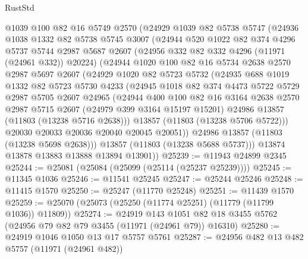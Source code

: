 \begin{lexlean}{RustStd}
\begin{coremodule}
    @1039
    @100
    @82
    @16
    @5749
    @2570
    (@24929
      @1039
      @82
      @5738
      @5747
      (@24936
        @1038
        @1332
        @82
        @5738
        @5745
        @3007
        (@24944
          @520
          @1022
          @82
          @374
          @4296
          @5737
          @5744
          @2987
          @5687
          @2607
          (@24956 @332 @82 @332 @4296 (@11971 (@24961 @332)) @20224)
          (@24944
            @1020
            @100
            @82
            @16
            @5734
            @2638
            @2570
            @2987
            @5697
            @2607
            (@24929
              @1020
              @82
              @5723
              @5732
              (@24935
                @688
                @1019
                @1332
                @82
                @5723
                @5730
                @4233
                (@24945
                  @1018
                  @82
                  @374
                  @4473
                  @5722
                  @5729
                  @2987
                  @5705
                  @2607
                  @24965
                  (@24944
                    @400
                    @100
                    @82
                    @16
                    @3164
                    @2638
                    @2570
                    @2987
                    @5715
                    @2607
                    (@24979 @399 @3164 @15197 @15201)
                    @24986
                    @13857
                    (@11803 (@13238 @5716 @2638)))
                  @13857
                  (@11803 (@13238 @5706 @5722)))
                @20030
                @20033
                @20036
                @20040
                @20045
                @20051))
            @24986
            @13857
            (@11803 (@13238 @5698 @2638)))
          @13857
          (@11803 (@13238 @5688 @5737)))
        @13874
        @13878
        @13883
        @13888
        @13894
        @13901))
@25239 := @11943 @24899 @2345
@25244 := @25081 (@25084 (@25099 (@25114 (@25237 @25239))))
@25245 := @11345 @1036
@25246 := @11541 @25245
@25247 := @25244 @25246
@25248 := @11415 @1570
@25250 := @25247 (@11770 @25248)
@25251 := @11439 @1570
@25259 := @25070 (@25073 (@25250 (@11774 @25251) (@11779 (@11799 @1036)) @11809))
@25274 := @24919
    @143
    @1051
    @82
    @18
    @3455
    @5762
    (@24956 @79 @82 @79 @3455 (@11971 (@24961 @79)) @16310)
@25280 := @24919 @1046 @1050 @13 @17 @5757 @5761
@25287 := @24956 @482 @13 @482 @5757 (@11971 (@24961 @482))

\end{coremodule}
\end{lexlean}
